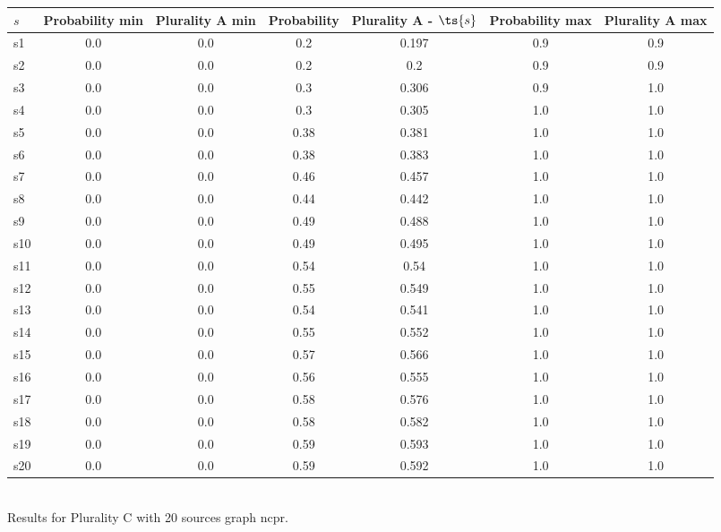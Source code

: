 \documentclass{article}
\begin{document}
\noindent\begin{tabular}{|l|c|c|c|c|c|c|}
\hline
$s$& Probability min & Plurality A min & Probability & Plurality A - $\ts{s}$ & Probability max & Plurality A max\\
\hline
s1 &0.0 & 0.0 & 0.2 & 0.197 & 0.9 & 0.9\\
\hline
s2 &0.0 & 0.0 & 0.2 & 0.2 & 0.9 & 0.9\\
\hline
s3 &0.0 & 0.0 & 0.3 & 0.306 & 0.9 & 1.0\\
\hline
s4 &0.0 & 0.0 & 0.3 & 0.305 & 1.0 & 1.0\\
\hline
s5 &0.0 & 0.0 & 0.38 & 0.381 & 1.0 & 1.0\\
\hline
s6 &0.0 & 0.0 & 0.38 & 0.383 & 1.0 & 1.0\\
\hline
s7 &0.0 & 0.0 & 0.46 & 0.457 & 1.0 & 1.0\\
\hline
s8 &0.0 & 0.0 & 0.44 & 0.442 & 1.0 & 1.0\\
\hline
s9 &0.0 & 0.0 & 0.49 & 0.488 & 1.0 & 1.0\\
\hline
s10 &0.0 & 0.0 & 0.49 & 0.495 & 1.0 & 1.0\\
\hline
s11 &0.0 & 0.0 & 0.54 & 0.54 & 1.0 & 1.0\\
\hline
s12 &0.0 & 0.0 & 0.55 & 0.549 & 1.0 & 1.0\\
\hline
s13 &0.0 & 0.0 & 0.54 & 0.541 & 1.0 & 1.0\\
\hline
s14 &0.0 & 0.0 & 0.55 & 0.552 & 1.0 & 1.0\\
\hline
s15 &0.0 & 0.0 & 0.57 & 0.566 & 1.0 & 1.0\\
\hline
s16 &0.0 & 0.0 & 0.56 & 0.555 & 1.0 & 1.0\\
\hline
s17 &0.0 & 0.0 & 0.58 & 0.576 & 1.0 & 1.0\\
\hline
s18 &0.0 & 0.0 & 0.58 & 0.582 & 1.0 & 1.0\\
\hline
s19 &0.0 & 0.0 & 0.59 & 0.593 & 1.0 & 1.0\\
\hline
s20 &0.0 & 0.0 & 0.59 & 0.592 & 1.0 & 1.0\\
\hline
\end{tabular}\\

\noindent Results for Plurality C with 20 sources graph ncpr.
\end{document}
